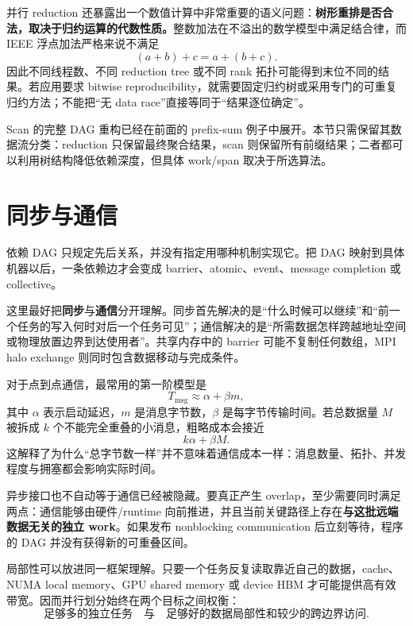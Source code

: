 并行 reduction 还暴露出一个数值计算中非常重要的语义问题：\textbf{树形重排是否合法，取决于归约运算的代数性质。}整数加法在不溢出的数学模型中满足结合律，而 IEEE 浮点加法严格来说不满足
\begin{equation}
(a+b)+c=a+(b+c).
\end{equation}
因此不同线程数、不同 reduction tree 或不同 rank 拓扑可能得到末位不同的结果。若应用要求 bitwise reproducibility，就需要固定归约树或采用专门的可重复归约方法；不能把“无 data race”直接等同于“结果逐位确定”。

Scan 的完整 DAG 重构已经在前面的 prefix-sum 例子中展开。本节只需保留其数据流分类：reduction 只保留最终聚合结果，scan 则保留所有前缀结果；二者都可以利用树结构降低依赖深度，但具体 work/span 取决于所选算法。

\section{同步与通信}

依赖 DAG 只规定先后关系，并没有指定用哪种机制实现它。把 DAG 映射到具体机器以后，一条依赖边才会变成 barrier、atomic、event、message completion 或 collective。

这里最好把\textbf{同步}与\textbf{通信}分开理解。同步首先解决的是“什么时候可以继续”和“前一个任务的写入何时对后一个任务可见”；通信解决的是“所需数据怎样跨越地址空间或物理放置边界到达使用者”。共享内存中的 barrier 可能不复制任何数组，MPI halo exchange 则同时包含数据移动与完成条件。

对于点到点通信，最常用的第一阶模型是
\begin{equation}
T_{\mathrm{msg}}\approx\alpha+\beta m,
\label{eq:parallel-alpha-beta}
\end{equation}
其中 $\alpha$ 表示启动延迟，$m$ 是消息字节数，$\beta$ 是每字节传输时间。若总数据量 $M$ 被拆成 $k$ 个不能完全重叠的小消息，粗略成本会接近
\begin{equation}
k\alpha+\beta M.
\end{equation}
这解释了为什么“总字节数一样”并不意味着通信成本一样：消息数量、拓扑、并发程度与拥塞都会影响实际时间。

异步接口也不自动等于通信已经被隐藏。要真正产生 overlap，至少需要同时满足两点：通信能够由硬件/runtime 向前推进，并且当前关键路径上存在\textbf{与这批远端数据无关的独立 work}。如果发布 nonblocking communication 后立刻等待，程序的 DAG 并没有获得新的可重叠区间。

局部性可以放进同一框架理解。只要一个任务反复读取靠近自己的数据，cache、NUMA local memory、GPU shared memory 或 device HBM 才可能提供高有效带宽。因而并行划分始终在两个目标之间权衡：
\begin{equation}
\boxed{
\text{足够多的独立任务}
\quad\text{与}\quad
\text{足够好的数据局部性和较少的跨边界访问}.
}
\end{equation}

